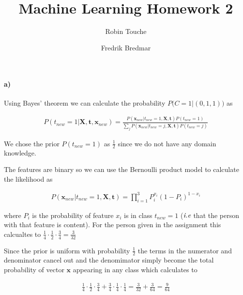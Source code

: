 \documentclass{article}
\author{
  Robin Touche \\
  \and
  Fredrik Bredmar
}
\title{Machine Learning Homework 2}
\begin{document}
\maketitle

\setcounter{section}{1}
\subsection{}
\paragraph{a)}

Using Bayes' theorem we can calculate the probability $P\big(C = 1 \vert (0, 1, 1)\big)$ as

\begin{align}
  P\left( t_{new} = 1 \vert \mathbf{X}, \mathbf{t}, \mathbf{x}_{new} \right)
  = \frac{P \left( \mathbf{x}_{new} \vert t_{new} = 1, \mathbf{X}, \mathbf{t} \right) P \left( t_{new} = 1 \right)}{ \sum_j P \left( \mathbf{x}_{new} \vert t_{new} = j, \mathbf{X}, \mathbf{t} \right) P \left( t_{new} = j \right) }
\end{align}

We chose the prior $P ( t_{new} = 1 )$ as $\frac{1}{2}$ since we do not have any
domain knowledge.

The features are binary so we can use the Bernoulli product model to
calculate the likelihood as

\begin{align}
  P \left( \mathbf{x}_{new} \vert t_{new} = 1, \mathbf{X}, \mathbf{t} \right) = \prod_{i = 1}^{3} P_i^{x_i} \left( 1 - P_i \right)^{1 - x_i}
\end{align}

where $P_i$ is the probability of feature $x_i$ is in class $t_{new} = 1$
($\emph{i.e}$ that the person with that feature is content).  For the person
given in the assignment this calcualtes to $\frac{1}{4} \cdot \frac{1}{2} \cdot
\frac{3}{4} = \frac{3}{32}$

Since the prior is uniform with probability $\frac{1}{2}$ the terms in the numerator
and denominator cancel out and the denomimator simply become the total
probability of vector $\mathbf{x}$ appearing in any class which calculates to

\begin{align}
  \frac{1}{4} \cdot \frac{1}{2} \cdot \frac{3}{4} + \frac{3}{4} \cdot \frac{1}{4} \cdot \frac{1}{4}  = \frac{3}{32} + \frac{3}{64} = \frac{9}{64}
\end{align}
\end{document}
